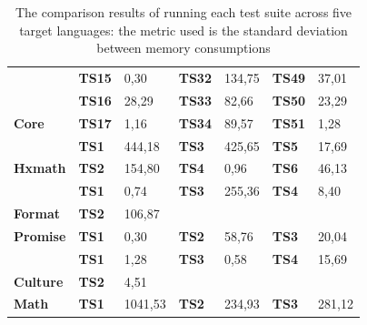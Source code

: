 \begin{table}[]
{\begin{tabular}{|l|l|l|l|l|l|l|}
		& \textbf{TS15}      & 0,30                            & \textbf{TS32}      & 134,75                         & \textbf{TS49}      & 37,01                          \\ \cline{2-7} 
		& \textbf{TS16}      & 28,29                           & \textbf{TS33}      & 82,66                          & \textbf{TS50}      & 23,29                          \\ \cline{2-7} 
		\multirow{-17}{*}{\textbf{Core}}            & \textbf{TS17}      & 1,16                            & \textbf{TS34}      & 89,57                          & \textbf{TS51}      & 1,28                           \\ \hline
		& \textbf{TS1}       & \cellcolor[HTML]{C0C0C0}444,18  & \textbf{TS3}       & \cellcolor[HTML]{C0C0C0}425,65 & \textbf{TS5}       & 17,69                          \\ \cline{2-7} 
		\multirow{-2}{*}{\textbf{Hxmath}}  & \textbf{TS2}       & 154,80                          & \textbf{TS4}       & 0,96                           & \textbf{TS6}       & 46,13                          \\ \hline
		& \textbf{TS1}       & 0,74                            & \textbf{TS3}       & 255,36                         & \textbf{TS4}       & 8,40                           \\ \cline{2-7} 
		\multirow{-2}{*}{\textbf{Format}}  & \textbf{TS2}       & 106,87                          & \multicolumn{4}{l|}{\textbf{}}                                                                            \\ \hline
		\textbf{Promise}                   & \textbf{TS1}       & 0,30                            & \textbf{TS2}       & 58,76                          & \textbf{TS3}       & 20,04                          \\ \hline
		& \textbf{TS1}       & 1,28                            & \textbf{TS3}       & 0,58                           & \textbf{TS4}       & 15,69                          \\ \cline{2-7} 
		\multirow{-2}{*}{\textbf{Culture}} & \textbf{TS2}       & 4,51                            & \multicolumn{4}{l|}{}                                                                                     \\ \hline
		\textbf{Math}                      & \textbf{TS1}       & \cellcolor[HTML]{C0C0C0}1041,53 & \textbf{TS2}       & 234,93                         & \textbf{TS3}       & 281,12                         \\ \hline
	\end{tabular}%
}
	\caption{The comparison results of running each test suite across five target languages: the metric used is the standard deviation between memory consumptions}
	\label{my-label}
\end{table}



